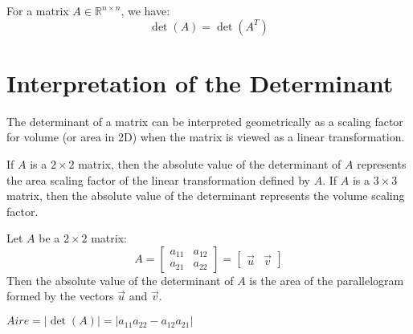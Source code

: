 \begin{theorem}
    For a matrix $A \in \mathbb{R}^{n \times n}$, we have:
    \[
        \det(A) = \det(A^T)
    \]
\end{theorem}

\section{Interpretation of the Determinant}
The determinant of a matrix can be interpreted geometrically as a scaling factor for volume (or area in 2D) when the matrix is viewed as a linear transformation.

\begin{theorem}
    If $A$ is a \(2 \times 2\) matrix, then the absolute value of the determinant of $A$ represents the area scaling factor of the linear transformation defined by $A$. If $A$ is a \(3 \times 3\) matrix, then the absolute value of the determinant represents the volume scaling factor.
\end{theorem}
\begin{eg}
    Let $A$ be a \(2 \times 2\) matrix:
    \[
        A = \begin{bmatrix}
            a_{11} & a_{12} \\
            a_{21} & a_{22}
        \end{bmatrix} = \begin{bmatrix}
            \vec{u} & \vec{v}
        \end{bmatrix}
    \]
    Then the absolute value of the determinant of $A$ is the area of the parallelogram formed by the vectors \(\vec{u}\) and \(\vec{v}\).
    \begin{center}
    \end{center}
    $Aire = |\det(A)| = |a_{11}a_{22} - a_{12}a_{21}|$
\end{eg}

